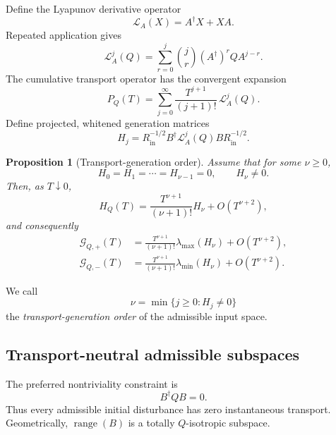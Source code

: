 \documentclass[11pt,a4paper]{article}
\newtheorem{proposition}{Proposition}
\newcommand{\range}{\operatorname{range}}
\newcommand{\la}{\lambda_{\max}}
\newcommand{\li}{\lambda_{\min}}
\newcommand{\Lin}{\mathcal{L}_A}
\newcommand{\PQ}{P_Q}
\newcommand{\HQ}{H_Q}
\begin{document}
Define the Lyapunov derivative operator
\begin{equation}
  \Lin(X)=A^\dagger X+XA.
\end{equation}
Repeated application gives
\begin{equation}
  \Lin^j(Q)
  =\sum_{r=0}^{j}\binom{j}{r}(A^\dagger)^r Q A^{j-r}.
\end{equation}
The cumulative transport operator has the convergent expansion
\begin{equation}
  \PQ(T)
  =\sum_{j=0}^{\infty}
  \frac{T^{j+1}}{(j+1)!}\,\Lin^j(Q).
  \label{eq:transportseries}
\end{equation}
Define projected, whitened generation matrices
\begin{equation}
  H_j
  =R_{\mathrm{in}}^{-1/2}
    B^\dagger \Lin^j(Q)B
    R_{\mathrm{in}}^{-1/2}.
\end{equation}

\begin{proposition}[Transport-generation order]
Assume that for some $\nu\ge0$,
\begin{equation}
  H_0=H_1=\cdots=H_{\nu-1}=0,
  \qquad H_\nu\neq0.
\end{equation}
Then, as $T\downarrow0$,
\begin{equation}
  \HQ(T)
  =\frac{T^{\nu+1}}{(\nu+1)!}H_\nu
   +O(T^{\nu+2}),
\end{equation}
and consequently
\begin{align}
  \mathcal{G}_{Q,+}(T)
  &=\frac{T^{\nu+1}}{(\nu+1)!}\la(H_\nu)+O(T^{\nu+2}),\\
  \mathcal{G}_{Q,-}(T)
  &=\frac{T^{\nu+1}}{(\nu+1)!}\li(H_\nu)+O(T^{\nu+2}).
\end{align}
\end{proposition}

We call
\begin{equation}
  \nu=\min\{j\ge0:H_j\neq0\}
\end{equation}
the \emph{transport-generation order} of the admissible input space.

\subsection{Transport-neutral admissible subspaces}

The preferred nontriviality constraint is
\begin{equation}
  B^\dagger QB=0.
  \label{eq:neutral}
\end{equation}
Thus every admissible initial disturbance has zero instantaneous transport. Geometrically, $\range(B)$ is a totally $Q$-isotropic subspace.
\end{document}
